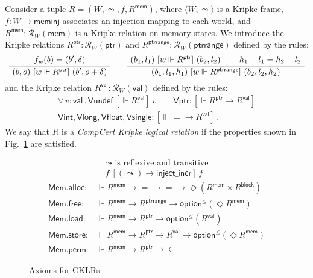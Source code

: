 \documentclass[acmsmall,timestamp,review,anonymous]{acmart}
\newcommand{\kw}[1]{\ensuremath{ \mathsf{#1} }}
\newcommand{\ifr}[1]{\ [{#1}]\ }
\begin{document}
\begin{definition} \label{def:cklr} %
Consider a tuple $R = (W, \leadsto, f, R^\kw{mem})$,
where
$\langle W, \leadsto \rangle$ is a Kripke frame,
$f : W \rightarrow \kw{meminj}$
associates an injection mapping to each world, and
$R^\kw{mem} : \mathcal{R}_{W}(\kw{mem})$
is a Kripke relation on memory states.
We introduce the Kripke relations
$R^\kw{ptr} : \mathcal{R}_W(\kw{ptr})$ and
$R^\kw{ptrrange} : \mathcal{R}_W(\kw{ptrrange})$
defined by the rules:
\[
  \AxiomC{$f_w(b) = (b', \delta)$}
  \UnaryInfC{$(b, o) \ifr{w \Vdash R^\kw{ptr}} (b', o + \delta)$}
  \DisplayProof
  \qquad
  \AxiomC{$(b_1, l_1) \ifr{w \Vdash R^\kw{ptr}} (b_2, l_2)$}
  \AxiomC{$h_1 - l_1 = h_2 - l_2$}
  \BinaryInfC{$(b_1, l_1, h_1) \ifr{w \Vdash R^\kw{ptrrange}} (b_2, l_2, h_2)$}
  \DisplayProof
\]
and the Kripke relation
$R^\kw{val} : \mathcal{R}_W(\kw{val})$
defined by the rules:
\begin{gather*}
  \forall \, v : \kw{val} \,.\,
    \kw{Vundef} \ifr{\Vdash R^\kw{val}} v \qquad
  \kw{Vptr} : {}
    [\Vdash R^\kw{ptr} \rightarrow R^\kw{val}] \\
  \kw{Vint}, \kw{Vlong}, \kw{Vfloat}, \kw{Vsingle} :
    [\Vdash {=} \rightarrow R^\kw{val}] \,.
\end{gather*}
We say that $R$ is a \emph{CompCert Kripke logical relation}
if the properties shown in Fig.~\ref{fig:cklr-def} are satisfied.
\end{definition}

\begin{figure} %
  \footnotesize
  \begin{gather*}
    {\leadsto} \mbox{ is reflexive and transitive} \\
    f \ifr{(\leadsto) \rightarrow \kw{inject\_incr}} f
  \end{gather*}
  \begin{align*}
      \kw{Mem.alloc} :
        &\Vdash R^\kw{mem} \rightarrow {=} \rightarrow {=} \rightarrow
        \Diamond (R^\kw{mem} \times R^\kw{block})
      \\
      \kw{Mem.free} :
        &\Vdash R^\kw{mem} \rightarrow R^\kw{ptrrange} \rightarrow
        \kw{option}^\le(\Diamond R^\kw{mem})
      \\
      \kw{Mem.load} :
        &\Vdash R^\kw{mem} \rightarrow R^\kw{ptr} \rightarrow
        \kw{option}^\le(R^\kw{val})
      \\
      \kw{Mem.store} :
        &\Vdash R^\kw{mem} \rightarrow R^\kw{ptr} \rightarrow R^\kw{val} \rightarrow
        \kw{option}^\le(\Diamond R^\kw{mem})
      \\
      \kw{Mem.perm} :
        &\Vdash R^\kw{mem} \rightarrow R^\kw{ptr} \rightarrow {\subseteq}
  \end{align*}
  \caption{Axioms for CKLRs}
  \label{fig:cklr-def}
\end{figure}
\end{document}
